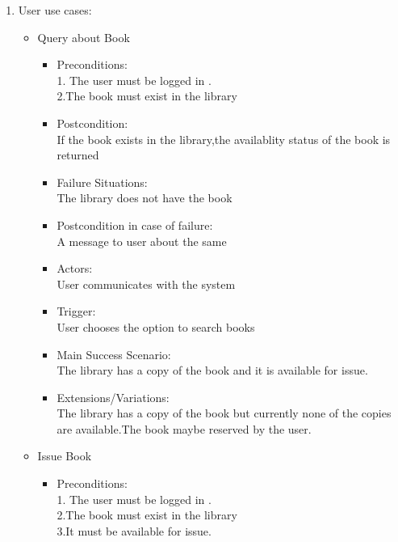 \documentclass[a4paper]{article}
\begin{document}
\begin{enumerate}
\item User use cases:
	\begin{itemize}
	
	\item Query about Book\\
	\begin{itemize}
	\item Preconditions:\\
	1. The user must be logged in .\\
	2.The book must exist in the library\\
\item  Postcondition: \\If the book exists in the library,the availablity status of the book is returned\\
 \item Failure Situations:\\ The library does not have  the book \\
 \item Postcondition in case of failure:\\A message to user about the same\\
\item  Actors:\\ User communicates with the system\\
\item  Trigger:\\ User chooses the option to search books\\
 \item Main Success Scenario: \\The library has a copy of the book and it is available for issue.\\
\item  Extensions/Variations: \\The library has a copy of the book but currently none of the copies are available.The book maybe reserved by the user.
	\end{itemize}
 \item Issue Book\\
	\begin{itemize}
	 \item Preconditions:\\
	 1. The user must be logged in .\\
	 2.The book must exist in the library \\
	 3.It must be available for issue.\\

\end{itemize}
\end{itemize}
\end{enumerate}
\end{document}
